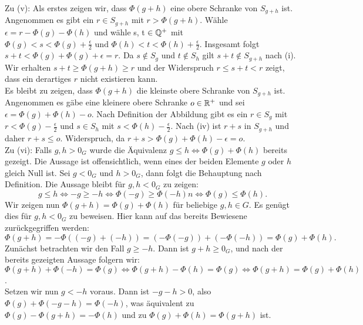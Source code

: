 {Zu (v): Als erstes zeigen wir, dass $\Phi\left(g + h\right)$ eine obere Schranke von $S_{g+h}$ ist. Angenommen es gibt ein $r\in S_{g+h}$ mit $r > \Phi\left(g + h\right)$. Wähle $\epsilon = r - \Phi\left(g\right) - \Phi\left(h\right)$ und wähle s, t $\in \mathbb{Q}^{+}$ mit $\Phi(g) < s < \Phi(g) + \frac{\epsilon}{2} \text{ und } \Phi\left(h\right) < t < \Phi\left(h\right) +\frac{\epsilon}{2}$. Insgesamt folgt $s + t < \Phi\left(g\right) + \Phi\left(g\right) + \epsilon = r$. Da $s \notin S_g$ und $t \notin S_h$ gilt $s+t \notin S_{g+h}$ nach (i). Wir erhalten $s+ t \geq \Phi\left(g+h\right) \geq r$ und der Widerspruch $ r \le s+t < r$ zeigt, dass ein derartiges $r$ nicht existieren kann.\\
Es bleibt zu zeigen, dass $\Phi\left(g + h\right)$ die kleinste obere Schranke von $S_{g+h}$ ist. Angenommen es gäbe eine kleinere obere Schranke $ o \in \mathbb{R}^{+}$ und sei $\epsilon = \Phi(g) + \Phi(h) - o$. Nach Definition der Abbildung gibt es ein $r\in S_g$ mit $r < \Phi(g) - \frac{\epsilon}{2}$ und $ s \in S_h$ mit $s < \Phi(h) - \frac{\epsilon}{2}.$ Nach (iv) ist $r+s$ in $S_{g+h} $ und daher $ r +s \le o$. Widerspruch, da $r+s >\Phi(g) + \Phi(h) - \epsilon = o$.\\
Zu (vi): Falls $g, h > 0_{G}$ wurde die Äquivalenz $g\le h \Leftrightarrow \Phi(g) + \Phi(h)$ bereits gezeigt. Die Aussage ist offensichtlich, wenn eines der beiden Elemente $g$ oder $h$ gleich Null ist. Sei $g < 0_G \text{ und } h > 0_G$, dann folgt die Behauptung nach Definition. Die Aussage bleibt für $g, h < 0_G$ zu zeigen: 
\[g \le h \Leftrightarrow -g \geq -h \Leftrightarrow \Phi\left(-g\right) \geq \Phi\left(-h\right)n \Leftrightarrow \Phi\left(g\right) \le \Phi\left(h\right).\]
Wir zeigen nun $\Phi(g+h) = \Phi\left(g\right) +\Phi\left(h\right)$ für beliebige $g,h \in G$. Es genügt dies für $g, h < 0_G$ zu beweisen. Hier kann auf das bereits Bewiesene zurückgegriffen werden: 
\[\Phi\left(g+h\right) = −\Phi\left((−g)+(−h)\right) = (−\Phi(−g))+(−\Phi(−h)) = \Phi(g)+\Phi(h).\]
Zunächst betrachten wir den Fall $g\geq −h$. Dann ist $g+h \geq 0_G$, und nach der bereits gezeigten Aussage folgern wir:\\
$\Phi(g+h)+ \Phi(−h) = \Phi(g) \Leftrightarrow \Phi(g+h)−\Phi(h) = \Phi(g) \Leftrightarrow \Phi(g+h) = \Phi(g)+ \Phi(h)$.\\
Setzen wir nun $g < −h$ voraus. Dann ist $−g−h > 0$, also $\Phi(g)+\Phi(−g−h) = \Phi(−h)$, was äquivalent zu $\Phi(g)−\Phi(g+h) = −\Phi(h)$ und zu $\Phi(g)+ \Phi(h) = \Phi(g+ h)$ ist.
}
